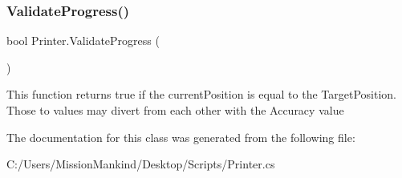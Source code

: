 \subsubsection{\texorpdfstring{Validate\+Progress()}{ValidateProgress()}}
{\footnotesize\ttfamily bool Printer.\+Validate\+Progress (\begin{DoxyParamCaption}{ }\end{DoxyParamCaption})\hspace{0.3cm}{\ttfamily [private]}}



This function returns true if the current\+Position is equal to the Target\+Position. Those to values may divert from each other with the Accuracy value 



The documentation for this class was generated from the following file\+:\begin{DoxyCompactItemize}
\item 
C\+:/\+Users/\+Mission\+Mankind/\+Desktop/\+Scripts/Printer.\+cs\end{DoxyCompactItemize}
